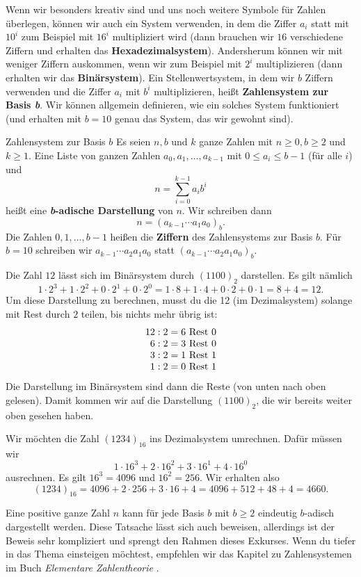 \documentclass[../../main.tex]{subfiles}
\begin{document}
Wenn wir besonders kreativ sind und uns noch weitere Symbole für Zahlen überlegen, können wir auch ein System verwenden,
in dem die Ziffer $a_i$ statt mit $10^i$ zum Beispiel mit $16^i$ multipliziert wird (dann brauchen wir $16$ verschiedene
Ziffern und erhalten das \textbf{Hexadezimalsystem}). Andersherum können wir mit weniger Ziffern auskommen, wenn wir zum
Beispiel mit $2^i$ multiplizieren (dann erhalten wir das \textbf{Binärsystem}). Ein Stellenwertsystem, in dem wir $b$
Ziffern verwenden und die Ziffer $a_i$ mit $b^i$ multiplizieren, heißt \textbf{Zahlensystem zur Basis \emph{b}}. Wir
können allgemein definieren, wie ein solches System funktioniert (und erhalten mit $b=10$ genau das System, das wir
gewohnt sind).
\begin{definition}{Zahlensystem zur Basis $b$}
    Es seien $n,b$ und $k$ ganze Zahlen mit $n\geq 0, b\geq 2$ und $k\geq 1$. Eine Liste von ganzen Zahlen
    $a_0,a_1,\dots,a_{k-1}$ mit $0\leq a_i\leq b-1$ (für alle $i$) und
    \[n=\sum_{i=0}^{k-1}a_ib^i\]
    heißt eine \textbf{\emph{b}-adische Darstellung} von $n$. Wir schreiben dann
    \[n=(a_{k-1}\cdots a_1a_0)_b.\]
    Die Zahlen $0,1,\dots,b-1$ heißen die \textbf{Ziffern} des Zahlensystems zur Basis $b$. Für $b=10$ schreiben wir
    $a_{k-1}\cdots a_2a_1a_0$ statt $(a_{k-1}\cdots a_2a_1a_0)_b$.
\end{definition}
\begin{example}{}
    Die Zahl $12$ lässt sich im Binärsystem durch $(1100)_2$ darstellen. Es gilt nämlich
    \[1\cdot 2^3+1\cdot 2^2+0\cdot 2^1+0\cdot 2^0=1\cdot 8+1\cdot 4+0\cdot 2+0\cdot 1=8+4=12.\]
    Um diese Darstellung zu berechnen, musst du die 12 (im Dezimalsystem) solange mit Rest durch $2$ teilen, bis nichts
    mehr übrig ist: 
    \[\begin{array}{r@{\null:\null}l@{\null=\null}l@{~\text{Rest }}l}
        12 & 2 & 6 & 0\\
         6 & 2 & 3 & 0\\
         3 & 2 & 1 & 1\\
         1 & 2 & 0 & 1
    \end{array}\]
    Die Darstellung im Binärsystem sind dann die Reste (von unten nach oben gelesen). Damit kommen wir auf die
    Darstellung $(1100)_2$, die wir bereits weiter oben gesehen haben.
\end{example}
\begin{example}[ex:hexadezimal]{}
    Wir möchten die Zahl $(1234)_{16}$ ins Dezimalsystem umrechnen. Dafür müssen wir
    \[1\cdot 16^3+2\cdot 16^2+3\cdot 16^1+4\cdot 16^0\]
    ausrechnen. Es gilt $16^3=4096$ und $16^2=256$. Wir erhalten also
    \[(1234)_{16}=4096+2\cdot 256+3\cdot 16+4=4096+512+48+4=4660.\]
\end{example}
Eine positive ganze Zahl $n$ kann für jede Basis $b$ mit $b\geq 2$ eindeutig $b$-adisch dargestellt werden. Diese
Tatsache lässt sich auch beweisen, allerdings ist der Beweis sehr kompliziert und sprengt den Rahmen dieses Exkurses.
Wenn du tiefer in das Thema einsteigen möchtest, empfehlen wir das Kapitel zu Zahlensystemen im Buch
\emph{Elementare Zahlentheorie} \cite{todo}.
\end{document}
